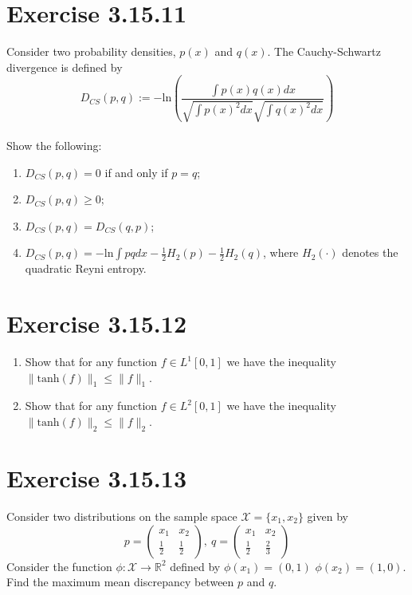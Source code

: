 \documentclass{exam}
\begin{document}
\section*{Exercise 3.15.11}
Consider two probability densities, $p(x)$ and $q(x)$. The Cauchy-Schwartz divergence is defined by 
\begin{equation*}
    D_{CS}(p,q) := -\text{ln}(\displaystyle\frac{\int p(x) q(x) d x}{\sqrt{\int p(x)^2 d x } \sqrt{\int q(x)^2 d x }})
\end{equation*}\\
Show the following: 
\begin{enumerate}
    \item $D_{CS}(p,q) = 0$ if and only if $p = q$;
    \item $D_{CS}(p,q) \geq 0$;
    \item $D_{CS}(p,q) = D_{CS}(q,p)$;
    \item $D_{CS}(p,q) = \displaystyle-\text{ln}\int pq d x  - \frac{1}{2}H_2(p) - \frac{1}{2}H_2(q)$, where $H_2(\cdot)$ denotes the quadratic Reyni entropy.
\end{enumerate}

\section*{Exercise 3.15.12}
\begin{enumerate}
    \item Show that for any function $f \in L^{1}[0,1]$ we have the inequality $\lVert \text{tanh}(f) \rVert_{1} \leq \lVert f \rVert_{1}$.
    \item Show that for any function $f \in L^{2} [0,1]$ we have the inequality $\lVert \text{tanh}(f) \rVert_{2} \leq \lVert f \rVert_{2}$.
\end{enumerate}

\section*{Exercise 3.15.13}
Consider two distributions on the sample space $\mathcal{X} = \{ x_1, x_2\}$ given by 
\begin{equation*}
    p = \begin{pmatrix}
        x_1 & x_2 \\
        \frac{1}{2} & \frac{1}{2}
        \end{pmatrix}, \ q = \begin{pmatrix}
            x_1 & x_2\\
            \frac{1}{2} & \frac{2}{3}
            \end{pmatrix}
\end{equation*}
Consider the function $\phi: \mathcal{X} \to \mathbb{R}^2$ defined by $\phi(x_1) = (0,1)$ $\phi(x_2) = (1,0)$. Find the maximum mean discrepancy between $p$ and $q$.
\end{document}
